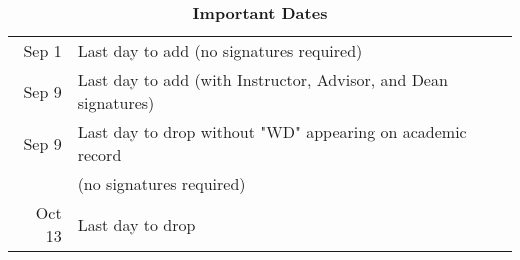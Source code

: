 \begin{table}[!h]
\caption{\bf{Important Dates}}
\begin{center}
\begin{tabular}{rl}
\hline
Sep 1 & Last day to add (no signatures required) \\
Sep 9 & Last day to add (with Instructor, Advisor, and Dean signatures) \\
Sep 9 & Last day to drop without "WD" appearing on academic record\\
            & (no signatures required) \\
Oct 13 & Last day to drop \\
\hline
\end{tabular}
\end{center}
\end{table}















